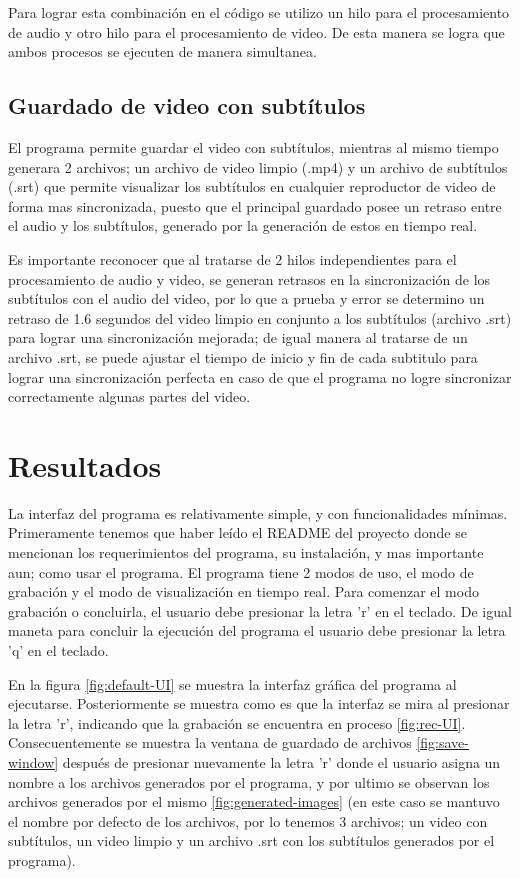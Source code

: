 \documentclass[conference]{IEEEtran}
\begin{document}
Para lograr esta combinación en el código se utilizo un hilo para el procesamiento de audio y otro hilo para el procesamiento de video. De esta manera se logra que ambos procesos se ejecuten de manera simultanea. 

\subsection{Guardado de video con subtítulos}
El programa permite guardar el video con subtítulos, mientras al mismo tiempo generara 2 archivos; un archivo de video limpio (.mp4) y un archivo de subtítulos (.srt) que permite visualizar los subtítulos en cualquier reproductor de video de forma mas sincronizada, puesto que el principal guardado posee un retraso entre el audio y los subtítulos, generado por la generación de estos en tiempo real.

Es importante reconocer que al tratarse de 2 hilos independientes para el procesamiento de audio y video, se generan retrasos en la sincronización de los subtítulos con el audio del video, por lo que a prueba y error se determino un retraso de 1.6 segundos del video limpio en conjunto a los subtítulos (archivo .srt) para lograr una sincronización mejorada; de igual manera al tratarse de un archivo .srt, se puede ajustar el tiempo de inicio y fin de cada subtitulo para lograr una sincronización perfecta en caso de que el programa no logre sincronizar correctamente algunas partes del video.


\section{Resultados}
La interfaz del programa es relativamente simple, y con funcionalidades mínimas. Primeramente tenemos que haber leído el README del proyecto donde se mencionan los requerimientos del programa, su instalación, y mas importante aun; como usar el programa. El programa tiene 2 modos de uso, el modo de grabación y el modo de visualización en tiempo real. Para comenzar el modo grabación o concluirla, el usuario debe presionar la letra 'r' en el teclado. De igual maneta para concluir la ejecución del programa el usuario debe presionar la letra 'q' en el teclado.

En la figura \ref{fig:default-UI} se muestra la interfaz gráfica del programa al ejecutarse. Posteriormente se muestra como es que la interfaz se mira al presionar la letra 'r', indicando que la grabación se encuentra en proceso \ref{fig:rec-UI}. Consecuentemente se muestra la ventana de guardado de archivos \ref{fig:save-window} después de presionar nuevamente la letra 'r' donde el usuario asigna un nombre a los archivos generados por el programa, y por ultimo se observan los archivos generados por el mismo \ref{fig:generated-images} (en este caso se mantuvo el nombre por defecto de los archivos, por lo tenemos 3 archivos; un video con subtítulos, un video limpio y un archivo .srt con los subtítulos generados por el programa).
\end{document}
